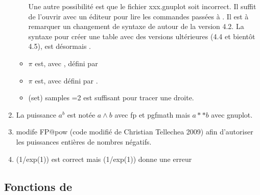 \begin{enumerate}
\begin{itemize}
Une autre possibilité est que le fichier xxx.gnuplot soit incorrect. Il suffit de l'ouvrir avec un éditeur pour lire les commandes passées à . Il est à remarquer un changement de syntaxe de  autour de la version 4.2. La syntaxe pour créer une table avec des versions ultérieures (4.4 et bientôt 4.5), est désormais  .


   \item $\pi$ est, avec , défini par 
   \item  $\pi$ est, avec  défini par .
   \item (set) samples =2 est suffisant pour tracer une droite.
  \end{itemize}

 \item La puissance $a^b$ est notée $a \wedge b$ avec fp et pgfmath mais $a**b$ avec gnuplot.

 \item {} modife FP@pow  (code modifié de Christian Tellechea 2009) afin d'autoriser les puissances entières de nombres  négatifs.


\item ({1/exp(1)}) est correct mais (1/exp(1)) donne une erreur
\end{enumerate}

\subsection{Fonctions de }


